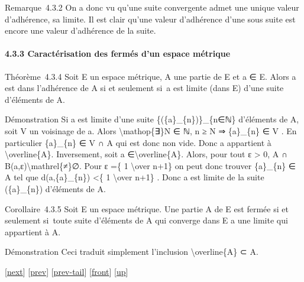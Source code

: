 \documentclass[]{article}
\begin{document}
Remarque~4.3.2 On a donc vu qu'une suite convergente admet une unique
valeur d'adhérence, sa limite. Il est clair qu'une valeur d'adhérence
d'une sous suite est encore une valeur d'adhérence de la suite.

\paragraph{4.3.3 Caractérisation des fermés d'un espace métrique}

Théorème~4.3.4 Soit E un espace métrique, A une partie de E et a ∈ E.
Alors a est dans l'adhérence de A si et seulement si~a est limite (dans
E) d'une suite d'éléments de A.

Démonstration Si a est limite d'une suite \{(\{a\}\_\{n\})\}\_\{n∈ℕ\}
d'éléments de A, soit V un voisinage de a. Alors
\textbackslash{}mathop\{∃\}N ∈ ℕ, n ≥ N ⇒ \{a\}\_\{n\} ∈ V . En
particulier \{a\}\_\{n\} ∈ V ∩ A qui est donc non vide. Donc a
appartient à \textbackslash{}overline\{A\}. Inversement, soit a
∈\textbackslash{}overline\{A\}. Alors, pour tout ε \textgreater{} 0, A ∩
B(a,ε)\textbackslash{}mathrel\{≠\}∅. Pour ε =\{ 1 \textbackslash{}over
n+1\} on peut donc trouver \{a\}\_\{n\} ∈ A tel que d(a,\{a\}\_\{n\})
\textless{}\{ 1 \textbackslash{}over n+1\} . Donc a est limite de la
suite (\{a\}\_\{n\}) d'éléments de A.

Corollaire~4.3.5 Soit E un espace métrique. Une partie A de E est fermée
si et seulement si~toute suite d'éléments de A qui converge dans E a une
limite qui appartient à A.

Démonstration Ceci traduit simplement l'inclusion
\textbackslash{}overline\{A\} ⊂ A.

{[}\href{coursse21.html}{next}{]} {[}\href{coursse19.html}{prev}{]}
{[}\href{coursse19.html\#tailcoursse19.html}{prev-tail}{]}
{[}\href{coursse20.html}{front}{]}
{[}\href{coursch5.html\#coursse20.html}{up}{]}
\end{document}
